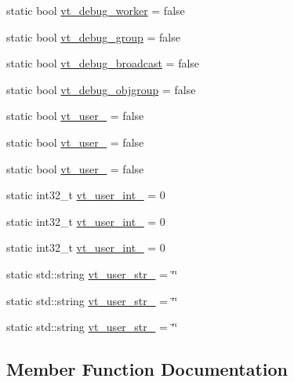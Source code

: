 \begin{DoxyCompactItemize}
\item 
static bool \hyperlink{structvt_1_1arguments_1_1_arg_config_a6386b3a1d890ff781a16546aefb6d642}{vt\+\_\+debug\+\_\+worker} = false
\item 
static bool \hyperlink{structvt_1_1arguments_1_1_arg_config_a858d2cf937f28c93c34d70ef30365664}{vt\+\_\+debug\+\_\+group} = false
\item 
static bool \hyperlink{structvt_1_1arguments_1_1_arg_config_a95bc48ba7cbf5bc30298d47633a15ea5}{vt\+\_\+debug\+\_\+broadcast} = false
\item 
static bool \hyperlink{structvt_1_1arguments_1_1_arg_config_aec0f3598cdf4a78b578a7ac8eaf6f0fc}{vt\+\_\+debug\+\_\+objgroup} = false
\item 
static bool \hyperlink{structvt_1_1arguments_1_1_arg_config_ad4e433d0d0a5e9cbe39a1045194fff3b}{vt\+\_\+user\+\_} = false
\item 
static bool \hyperlink{structvt_1_1arguments_1_1_arg_config_a0c3fedfb03820032fc87969ff3eabd77}{vt\+\_\+user\+\_} = false
\item 
static bool \hyperlink{structvt_1_1arguments_1_1_arg_config_a91c4c1cdfab2def4254db74c705245f6}{vt\+\_\+user\+\_} = false
\item 
static int32\+\_\+t \hyperlink{structvt_1_1arguments_1_1_arg_config_a8592495c8eb82047645a9b5e0b741907}{vt\+\_\+user\+\_\+int\+\_} = 0
\item 
static int32\+\_\+t \hyperlink{structvt_1_1arguments_1_1_arg_config_ac80c25baf981f06e7f37045371a5336d}{vt\+\_\+user\+\_\+int\+\_} = 0
\item 
static int32\+\_\+t \hyperlink{structvt_1_1arguments_1_1_arg_config_a2dc50d3f0598a0a998923695f681c93a}{vt\+\_\+user\+\_\+int\+\_} = 0
\item 
static std\+::string \hyperlink{structvt_1_1arguments_1_1_arg_config_a892f7cf1b072e8fec60f5b88762f151e}{vt\+\_\+user\+\_\+str\+\_} = \char`\"{}\char`\"{}
\item 
static std\+::string \hyperlink{structvt_1_1arguments_1_1_arg_config_aaac3dd90077934c6faa99570d9b95ca1}{vt\+\_\+user\+\_\+str\+\_} = \char`\"{}\char`\"{}
\item 
static std\+::string \hyperlink{structvt_1_1arguments_1_1_arg_config_a848bd14c34337ef8d48fd740061a4923}{vt\+\_\+user\+\_\+str\+\_} = \char`\"{}\char`\"{}
\end{DoxyCompactItemize}


\subsection{Member Function Documentation}
\mbox{\label{structvt_1_1arguments_1_1_arg_config_ae47fd5ec6ec8607e0adbe4655b840062}} 
